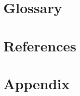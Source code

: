 \documentclass[a4paper, 12pt]{article}
\begin{document}
\section{Glossary}
\newpage

\section{References}
\newpage

\section{Appendix}
\newpage
\end{document}
